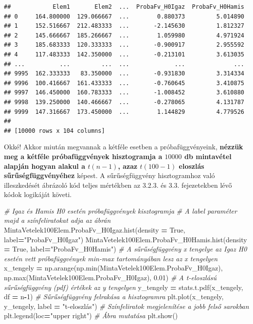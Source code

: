 \documentclass[
]{book}
\newenvironment{Shaded}{\begin{snugshade}}{\end{snugshade}}
\newcommand{\BuiltInTok}[1]{#1}
\newcommand{\CommentTok}[1]{\textcolor[rgb]{0.56,0.35,0.01}{\textit{#1}}}
\newcommand{\DecValTok}[1]{\textcolor[rgb]{0.00,0.00,0.81}{#1}}
\newcommand{\FloatTok}[1]{\textcolor[rgb]{0.00,0.00,0.81}{#1}}
\newcommand{\NormalTok}[1]{#1}
\newcommand{\OperatorTok}[1]{\textcolor[rgb]{0.81,0.36,0.00}{\textbf{#1}}}
\newcommand{\StringTok}[1]{\textcolor[rgb]{0.31,0.60,0.02}{#1}}
\newcommand{\VariableTok}[1]{\textcolor[rgb]{0.00,0.00,0.00}{#1}}
\begin{document}
\begin{verbatim}
##            Elem1       Elem2  ...  ProbaFv_H0Igaz  ProbaFv_H0Hamis
## 0     164.800000  129.066667  ...        0.880373         5.014890
## 1     152.516667  212.483333  ...       -2.145630         1.812327
## 2     145.666667  185.266667  ...        1.059980         4.971924
## 3     185.683333  120.333333  ...       -0.900917         2.955592
## 4     117.483333  142.350000  ...       -0.213101         3.613035
## ...          ...         ...  ...             ...              ...
## 9995  162.333333   83.350000  ...       -0.931830         3.314334
## 9996  100.416667  161.433333  ...       -0.760645         3.410875
## 9997  146.450000  160.783333  ...       -1.008452         3.610880
## 9998  139.250000  140.466667  ...       -0.278065         4.131787
## 9999  147.316667  173.450000  ...        1.144829         4.779526
## 
## [10000 rows x 104 columns]
\end{verbatim}

Okké! Akkor miután megvannak a kétféle esetben a próbafüggvényeink, \textbf{nézzük meg a kétféle próbafüggvények hisztogramja a \(10000\) db mintavétel alapján hogyan alakul a \(t(n-1)\), azaz \(t(100-1)\) eloszlás sűrűségfüggvényéhez} képest.
A sűrűségfüggvény hisztogramhoz való illeszkedését ábrázoló kód teljes mértékben az 3.2.3. és 3.3. fejezetekben lévő kódok logikáját követi.

\begin{Shaded}
\begin{Highlighting}[]
\CommentTok{\# Igaz és Hamis H0 esetén próbafüggvények kisztogramja}
\CommentTok{\# A \textquotesingle{}label\textquotesingle{} paraméter majd a színfeliratokat adja az ábrán}
\NormalTok{MintaVetelek100Elem.ProbaFv\_H0Igaz.hist(density }\OperatorTok{=} \VariableTok{True}\NormalTok{, label}\OperatorTok{=}\StringTok{"ProbaFv\_H0Igaz"}\NormalTok{)}
\NormalTok{MintaVetelek100Elem.ProbaFv\_H0Hamis.hist(density }\OperatorTok{=} \VariableTok{True}\NormalTok{, label}\OperatorTok{=}\StringTok{"ProbaFv\_H0Hamis"}\NormalTok{)}
\CommentTok{\# A sűrűségfüggvény x tengelye az Igaz H0 esetén vett próbafüggvények min{-}max tartományában lesz az \textquotesingle{}x\textquotesingle{} tengelyen}
\NormalTok{x\_tengely }\OperatorTok{=}\NormalTok{ np.arange(np.}\BuiltInTok{min}\NormalTok{(MintaVetelek100Elem.ProbaFv\_H0Igaz), np.}\BuiltInTok{max}\NormalTok{(MintaVetelek100Elem.ProbaFv\_H0Igaz), }\FloatTok{0.01}\NormalTok{)}
\CommentTok{\# A t{-}eloszlású sűrűségfüggvény (pdf) értékek az \textquotesingle{}y\textquotesingle{} tengelyen}
\NormalTok{y\_tengely }\OperatorTok{=}\NormalTok{ stats.t.pdf(x\_tengely, df }\OperatorTok{=}\NormalTok{ n}\OperatorTok{{-}}\DecValTok{1}\NormalTok{)}
\CommentTok{\# Sűrűségfüggvény felrakása a hisztogramra}
\NormalTok{plt.plot(x\_tengely, y\_tengely, label }\OperatorTok{=} \StringTok{"t{-}eloszlás"}\NormalTok{)}
\CommentTok{\# Színfeliratok megjelenítése a jobb felső sarokban}
\NormalTok{plt.legend(loc}\OperatorTok{=}\StringTok{"upper right"}\NormalTok{)}
\CommentTok{\# Ábra mutatása}
\NormalTok{plt.show()}
\end{Highlighting}
\end{Shaded}
\end{document}
